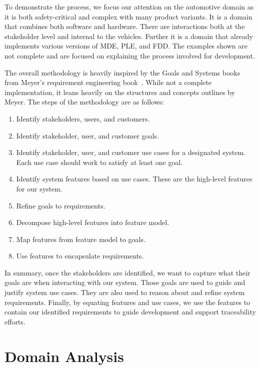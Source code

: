 To demonstrate the process, we focus our attention on the automotive domain as it is both safety-critical and complex with many product variants. It is a domain that combines both software and hardware. There are interactions both at the stakeholder level and internal to the vehicles. Further it is a domain that already implements various versions of \ac{MDE}, \ac{PLE}, and \ac{FDD}. The examples shown are not complete and are focused on explaining the process involved for development.

The overall methodology is heavily inspired by the Goals and Systems books from Meyer's requirement engineering book~\cite{meyer2022handbook}. While not a complete implementation, it leans heavily on the structures and concepts outlines by Meyer. The steps of the methodology are as follows:
\begin{enumerate}
	\item Identify stakeholders, users, and customers.
	\item Identify stakeholder, user, and customer goals.
	\item Identify stakeholder, user, and customer use cases for a designated system. Each use case should work to satisfy at least one goal.
	\item Identify system features based on use cases. These are the high-level features for our system.
	\item Refine goals to requirements.
	\item Decompose high-level features into feature model.
	\item Map features from feature model to goals.
	\item Use features to encapsulate requirements.
\end{enumerate}

In summary, once the stakeholders are identified, we want to capture what their goals are when interacting with our system. Those goals are used to guide and justify system use cases. They are also used to reason about and refine system requirements. Finally, by equating features and use cases, we use the features to contain our identified requirements to guide development and support traceability efforts.

\section{Domain Analysis}

